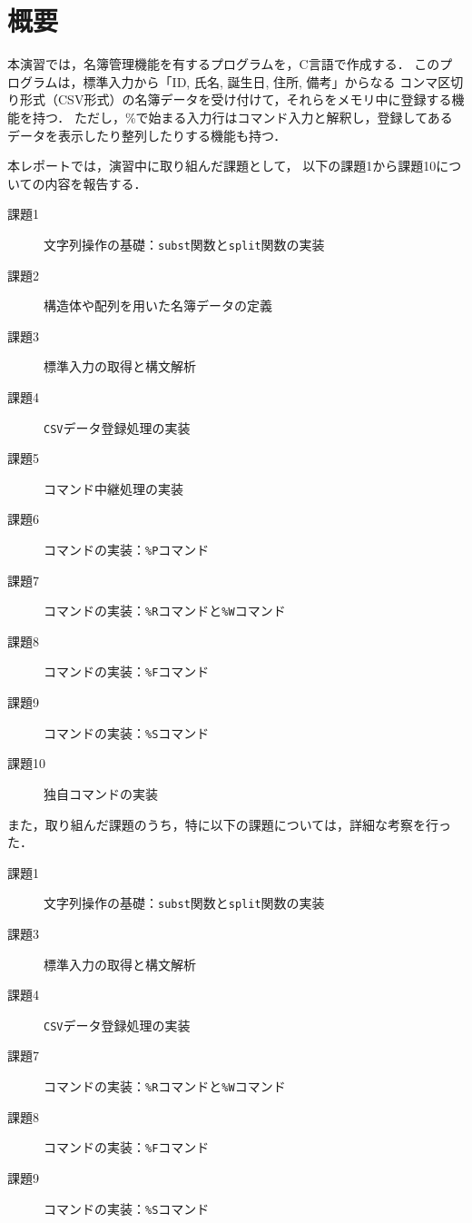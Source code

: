 \section{概要} \label{sec:abstract}

本演習では，名簿管理機能を有するプログラムを，C言語で作成する．
このプログラムは，標準入力から「ID, 氏名, 誕生日, 住所, 備考」からなる
コンマ区切り形式（CSV形式）の名簿データを受け付けて，それらをメモリ中に登録する機能を持つ．
ただし，\%で始まる入力行はコマンド入力と解釈し，登録してあるデータを表示したり整列したりする機能も持つ．

本レポートでは，演習中に取り組んだ課題として，
以下の課題1から課題10についての内容を報告する．
%
\begin{description}
  \item[課題1] 文字列操作の基礎：\verb|subst|関数と\verb|split|関数の実装
  \item[課題2] 構造体や配列を用いた名簿データの定義
  \item[課題3] 標準入力の取得と構文解析
  \item[課題4] \verb|CSV|データ登録処理の実装
  \item[課題5] コマンド中継処理の実装
  \item[課題6] コマンドの実装：\verb|%P|コマンド
  \item[課題7] コマンドの実装：\verb|%R|コマンドと\verb|%W|コマンド
  \item[課題8] コマンドの実装：\verb|%F|コマンド
  \item[課題9] コマンドの実装：\verb|%S|コマンド
  \item[課題10] 独自コマンドの実装
\end{description}
%
また，取り組んだ課題のうち，特に以下の課題については，詳細な考察を行った．
%
\begin{description}
  \item[課題1] 文字列操作の基礎：\verb|subst|関数と\verb|split|関数の実装
  \item[課題3] 標準入力の取得と構文解析
  \item[課題4] \verb|CSV|データ登録処理の実装
  \item[課題7] コマンドの実装：\verb|%R|コマンドと\verb|%W|コマンド
  \item[課題8] コマンドの実装：\verb|%F|コマンド
  \item[課題9] コマンドの実装：\verb|%S|コマンド
\end{description}



